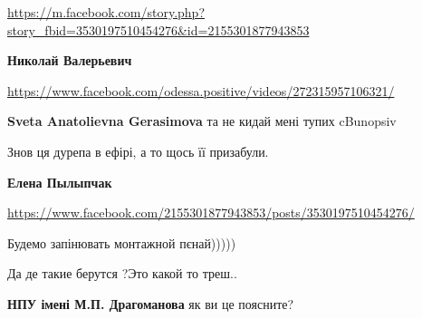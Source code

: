 \begin{itemize}
\url{https://m.facebook.com/story.php?story_fbid=3530197510454276&id=2155301877943853}


\textbf{Николай Валерьевич} 

\url{https://www.facebook.com/odessa.positive/videos/272315957106321/}


\textbf{Sveta Anatolievna Gerasimova} та не кидай мені тупих cBunopsiv

\end{itemize}


Знов ця дурепа в ефірі, а то щось її призабули.

\begin{itemize}

\textbf{Елена Пылыпчак} 

\url{https://www.facebook.com/2155301877943853/posts/3530197510454276/}
\end{itemize}


Будемо запінювать монтажной пєнай)))))


Да де такие берутся ?Это какой то треш..


\textbf{НПУ імені М.П. Драгоманова} як ви це поясните?

